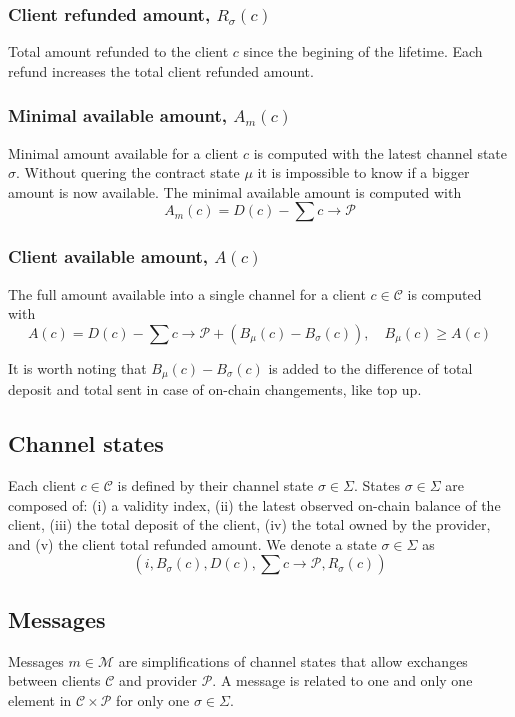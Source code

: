 \documentclass{llncs}
\begin{document}
\subsubsection{Client refunded amount, $R_\sigma(c)$} Total amount refunded to the client $c$ since the begining of the lifetime. Each refund increases the total client refunded amount.

\subsubsection{Minimal available amount, $A_m(c)$} Minimal amount available for a client $c$ is computed with the latest channel state $\sigma$. Without quering the contract state $\mu$ it is impossible to know if a bigger amount is now available. The minimal available amount is computed with
$$A_m(c) = D(c) - \textstyle \sum c \rightarrow \mathcal{P}$$

\subsubsection{Client available amount, $A(c)$} The full amount available into a single channel for a client $c \in \mathcal{C}$ is computed with
$$A(c) = D(c) - \textstyle \sum c \rightarrow \mathcal{P} + (B_\mu(c) - B_\sigma(c)), \quad B_\mu(c) \geq A(c)$$

It is worth noting that $B_\mu(c) - B_\sigma(c)$ is added to the difference of total deposit and total sent in case of on-chain changements, like top up.

\subsection{Channel states} Each client $c \in \mathcal{C}$ is defined by their channel state $\sigma \in \Sigma$. States $\sigma \in \Sigma$ are composed of: (i) a validity index, (ii) the latest observed on-chain balance
of the client, (iii) the total deposit of the client, (iv) the total owned by the provider, and (v) the client total refunded amount. We denote a state $\sigma \in \Sigma$ as
$$(i, B_\sigma(c), D(c), \textstyle \sum c \rightarrow \mathcal{P},R_\sigma(c))$$

\subsection{Messages} Messages $m \in \mathcal{M}$ are simplifications of channel states that allow exchanges between clients $\mathcal{C}$ and provider $\mathcal{P}$. A message is related to one and only one element in $\mathcal{C} \times \mathcal{P}$ for only one $\sigma \in \Sigma$.
\end{document}
